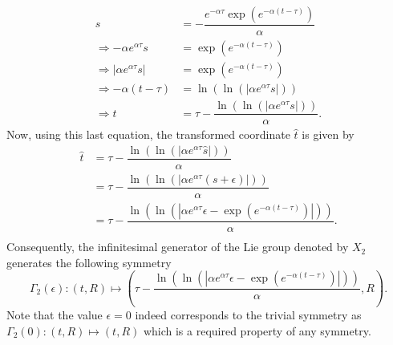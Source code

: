 \begin{align*}
  s&= -\dfrac{e^{-\alpha\tau}\exp\left(e^{-\alpha (t-\tau)}\right)}{\alpha}\\
  \Longrightarrow -\alpha e^{\alpha\tau} s&=\exp\left(e^{-\alpha (t-\tau)}\right)\\
  \Longrightarrow |\alpha e^{\alpha\tau} s|&=\exp\left(e^{-\alpha (t-\tau)}\right)\\
  \Longrightarrow -\alpha (t-\tau)&=\ln\left(\ln\left(|\alpha e^{\alpha\tau} s|\right)\right)\\
  \Longrightarrow t&=\tau-\dfrac{\ln\left(\ln\left(|\alpha e^{\alpha\tau} s|\right)\right)}{\alpha}. 
\end{align*}
Now, using this last equation, the transformed coordinate $\hat{t}$ is given by
\begin{align*}
  \hat{t}&=\tau-\dfrac{\ln\left(\ln\left(|\alpha e^{\alpha\tau} \hat{s}|\right)\right)}{\alpha}\\
         &=\tau-\dfrac{\ln\left(\ln\left(\left|\alpha e^{\alpha\tau} (s+\epsilon)\right|\right)\right)}{\alpha}\\
         &=\tau-\dfrac{\ln\left(\ln\left(\left|\alpha e^{\alpha\tau} \epsilon-\exp\left(e^{-\alpha (t-\tau)}\right)\right|\right)\right)}{\alpha}.\\  
\end{align*}
Consequently, the infinitesimal generator of the Lie group denoted by $X_2$ generates the following symmetry
$$\Gamma_2(\epsilon):(t,R)\mapsto\left(\tau-\dfrac{\ln\left(\ln\left(\left|\alpha e^{\alpha\tau} \epsilon-\exp\left(e^{-\alpha (t-\tau)}\right)\right|\right)\right)}{\alpha},R\right).$$
Note that the value $\epsilon=0$ indeed corresponds to the trivial symmetry as $\Gamma_2(0):(t,R)\mapsto(t,R)$ which is a required property of any symmetry.